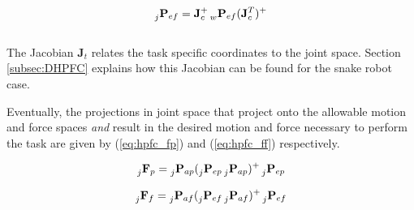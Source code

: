 \begin{equation}\label{eq:hpfc_jeF}
    \prescript{}{j}{\mathbf{P}}_{ef} = \mathbf{J}_c^+ \prescript{}{w}{\mathbf{P}}_{ef} (\mathbf{J}_c^T)^+
\end{equation}
\\
The Jacobian $\mathbf{J}_t$ relates the task specific coordinates to the joint space. Section \ref{subsec:DHPFC} explains how this Jacobian can be found for the snake robot case.

Eventually, the projections in joint space that project onto the allowable motion and force spaces \textit{and} result in the desired motion and force necessary to perform the task are given by (\ref{eq:hpfc_fp}) and (\ref{eq:hpfc_ff}) respectively.

\begin{equation}\label{eq:hpfc_fp}
    \prescript{}{j}{\mathbf{F}}_{p} = \prescript{}{j}{\mathbf{P}}_{ap} (\prescript{}{j}{\mathbf{P}}_{ep} \prescript{}{j}{\mathbf{P}}_{ap})^+ \prescript{}{j}{\mathbf{P}}_{ep}
\end{equation}

\begin{equation}\label{eq:hpfc_ff}
    \prescript{}{j}{\mathbf{F}}_{f} = \prescript{}{j}{\mathbf{P}}_{af} (\prescript{}{j}{\mathbf{P}}_{ef} \prescript{}{j}{\mathbf{P}}_{af})^+ \prescript{}{j}{\mathbf{P}}_{ef}
\end{equation}
